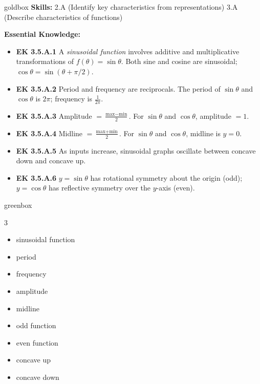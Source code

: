 \documentclass[10pt]{article}
\begin{document}
\begin{skillbox}{goldbox}
  \textbf{Skills:} 2.A (Identify key characteristics from representations) \quad
  3.A (Describe characteristics of functions)

  \medskip
  \textbf{Essential Knowledge:}
  \begin{itemize}
    \item \textbf{EK 3.5.A.1} A \textit{sinusoidal function} involves additive and
          multiplicative transformations of $f(\theta)=\sin\theta$.
          Both sine and cosine are sinusoidal; $\cos\theta = \sin(\theta+\pi/2)$.
    \item \textbf{EK 3.5.A.2} Period and frequency are reciprocals.
          The period of $\sin\theta$ and $\cos\theta$ is $2\pi$; frequency is
          $\tfrac{1}{2\pi}$.
    \item \textbf{EK 3.5.A.3} Amplitude $=\tfrac{\text{max}-\text{min}}{2}$.
          For $\sin\theta$ and $\cos\theta$, amplitude $= 1$.
    \item \textbf{EK 3.5.A.4} Midline $= \tfrac{\text{max}+\text{min}}{2}$.
          For $\sin\theta$ and $\cos\theta$, midline is $y=0$.
    \item \textbf{EK 3.5.A.5} As inputs increase, sinusoidal graphs oscillate
          between concave down and concave up.
    \item \textbf{EK 3.5.A.6} $y=\sin\theta$ has rotational symmetry about the
          origin (odd); $y=\cos\theta$ has reflective symmetry over the $y$-axis
          (even).
  \end{itemize}
\end{skillbox}

\begin{skillbox}{greenbox}
  \begin{multicols}{3}
  \begin{itemize}
    \item sinusoidal function
    \item period
    \item frequency
    \item amplitude
    \item midline
    \item odd function
    \item even function
    \item concave up
    \item concave down
  \end{itemize}
  \end{multicols}
\end{skillbox}
\end{document}
